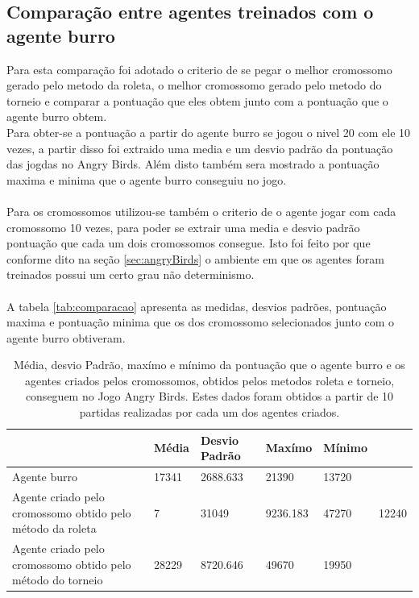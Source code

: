 \documentclass[10pt,a4paper]{article}
\begin{document}
\subsection{Comparação entre agentes treinados com o agente burro}
Para esta comparação foi adotado o criterio de se pegar o melhor cromossomo gerado pelo metodo da roleta, o melhor cromossomo gerado pelo metodo do torneio e comparar a pontuação que eles obtem junto com a pontuação que o agente burro obtem. \\ 
Para obter-se a pontuação a partir do agente burro se jogou o nivel 20 com ele 10 vezes, a partir disso foi extraido uma media e um desvio padrão da pontuação das jogdas no Angry Birds. Além disto também sera mostrado a pontuação maxima e minima que o agente burro conseguiu no jogo. \\ \\ 
Para os cromossomos utilizou-se também o criterio de o agente jogar com cada cromossomo 10 vezes, para poder se extrair uma media e desvio padrão pontuação que cada um dois cromossomos consegue. Isto foi feito por que conforme dito na seção \ref{sec:angryBirds} o ambiente em que os agentes foram treinados possui um certo grau não determinismo. \\ \\
A tabela \ref{tab:comparacao} apresenta as medidas, desvios padrões, pontuação maxima e pontuação minima que os dos cromossomo selecionados junto com o agente burro obtiveram.
\begin{table}[h]
  \small
  \begin{tabular}{|L{5cm}|l|l|l|l|}%
    \hline                                                                    
    \textbf{} & \textbf{Média} & \textbf{Desvio Padrão} & \textbf{Maxímo} & \textbf{Mínimo} \\ \hline 
    Agente burro & 17341 & 2688.633 & 21390 & 13720 \\ \hline
    Agente criado  pelo cromossomo obtido pelo método da roleta & 7 & 31049 & 9236.183 & 47270 & 12240 \\ \hline
    Agente criado pelo cromossomo obtido pelo método do torneio & 28229 & 8720.646 & 49670  & 19950 \\ \hline
  \end{tabular}
  \caption{Média, desvio Padrão, maxímo e mínimo da pontuação que o agente burro e os agentes criados pelos cromossomos, obtidos pelos metodos roleta e torneio, conseguem no Jogo Angry Birds. Estes dados foram obtidos a partir de 10 partidas realizadas por cada um dos agentes criados.}
  \label{tab:comparacaoDosAgentes}    
\end{table}
\end{document}
